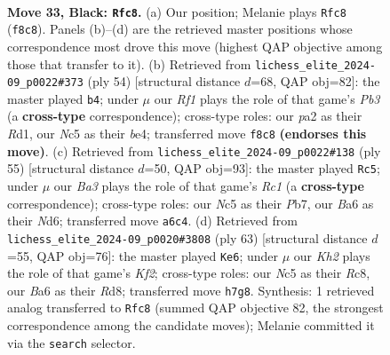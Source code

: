 \documentclass[11pt]{article}
\begin{document}
\clearpage

\begin{figure}[p]\centering
\begin{subfigure}{0.46\textwidth}\centering
\resizebox{\linewidth}{!}{%
\newchessgame
\chessboard[
  setfen={1r3r2/p4p1k/bpB1p1pp/2n5/2P5/N1B1P2P/PR3PP1/5K1R b - - 12 33},
  showmover=false,
  pgfstyle=straightmove, color=movearrow, markmove={f8-c8}
]}
\caption{}
\end{subfigure}\hfill
\begin{subfigure}{0.46\textwidth}\centering
\resizebox{\linewidth}{!}{%
\newchessgame
\chessboard[
  setfen={5rk1/1p4p1/4r2p/BNb2p2/2P1b3/PP1pP1P1/3P3P/3R1RK1 w - - 1 28},
  showmover=false,
  pgfstyle=straightmove, color=movearrow, markmove={b3-b4}
]}
\caption{}
\end{subfigure}
\\[4pt]
\begin{subfigure}{0.46\textwidth}\centering
\resizebox{\linewidth}{!}{%
\newchessgame
\chessboard[
  setfen={2r4r/pp3kpp/b2n1p2/3Pp3/P1P5/3B2P1/3N1PP1/R1R3K1 b - - 4 28},
  showmover=false,
  pgfstyle=straightmove, color=movearrow, markmove={c8-c5}
]}
\caption{}
\end{subfigure}\hfill
\begin{subfigure}{0.46\textwidth}\centering
\resizebox{\linewidth}{!}{%
\newchessgame
\chessboard[
  setfen={2rr4/p4kp1/1p1P1p1p/5p2/1Nn1b3/2P3B1/P4RPP/3R2K1 b - - 2 32},
  showmover=false,
  pgfstyle=straightmove, color=movearrow, markmove={f7-e6}
]}
\caption{}
\end{subfigure}
\caption{\textbf{Move 33, Black: \texttt{Rfc8}.} (a) Our position; Melanie plays \texttt{Rfc8} (\texttt{f8c8}). Panels (b)--(d) are the retrieved master positions whose correspondence most drove this move (highest QAP objective among those that transfer to it). (b) Retrieved from \texttt{lichess\_elite\_2024-09\_p0022\#373} (ply 54) [structural distance $d$=68, QAP obj=82]: the master played \texttt{b4}; under $\mu$ our \emph{Rf1} plays the role of that game's \emph{Pb3} (a \textbf{cross-type} correspondence); cross-type roles: our \emph{p}a2 as their \emph{R}d1, our \emph{N}c5 as their \emph{b}e4; transferred move \texttt{f8c8} \textbf{(endorses this move)}. (c) Retrieved from \texttt{lichess\_elite\_2024-09\_p0022\#138} (ply 55) [structural distance $d$=50, QAP obj=93]: the master played \texttt{Rc5}; under $\mu$ our \emph{Ba3} plays the role of that game's \emph{Rc1} (a \textbf{cross-type} correspondence); cross-type roles: our \emph{N}c5 as their \emph{P}b7, our \emph{B}a6 as their \emph{N}d6; transferred move \texttt{a6c4}. (d) Retrieved from \texttt{lichess\_elite\_2024-09\_p0020\#3808} (ply 63) [structural distance $d$=55, QAP obj=76]: the master played \texttt{Ke6}; under $\mu$ our \emph{Kh2} plays the role of that game's \emph{Kf2}; cross-type roles: our \emph{N}c5 as their \emph{R}c8, our \emph{B}a6 as their \emph{R}d8; transferred move \texttt{h7g8}. Synthesis: 1 retrieved analog transferred to \texttt{Rfc8} (summed QAP objective 82, the strongest correspondence among the candidate moves); Melanie committed it via the \texttt{search} selector.}
\label{fig:thought-m65}
\end{figure}
\end{document}
